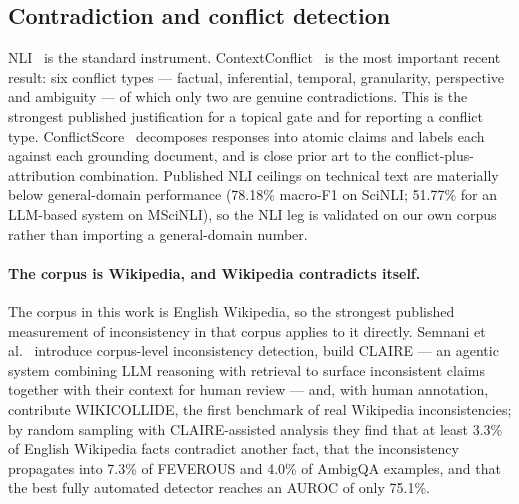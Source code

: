 \documentclass[preprint,3p,times]{elsarticle}
\begin{document}
\subsection{Contradiction and conflict detection}

NLI~\cite{williams2018mnli,nie2020anli} is the standard instrument.
ContextConflict~\cite{yang2026contextconflict} is the most important recent
result: six conflict types --- factual, inferential, temporal, granularity,
perspective and ambiguity --- of which only two are genuine contradictions. This
is the strongest published justification for a topical gate and for reporting a
conflict type. ConflictScore~\cite{liu2026conflictscore} decomposes responses
into atomic claims and labels each against each grounding document, and is
close prior art to the conflict-plus-attribution combination. Published NLI
ceilings on technical text are materially below general-domain performance
(78.18\% macro-F1 on SciNLI; 51.77\% for an LLM-based system on MSciNLI), so
the NLI leg is validated on our own corpus rather than importing a
general-domain number.

\paragraph{The corpus is Wikipedia, and Wikipedia contradicts itself.}
The corpus in this work is English Wikipedia, so the strongest published
measurement of inconsistency in that corpus applies to it directly. Semnani
et al.~\cite{semnani2025wikicollide} introduce corpus-level inconsistency
detection, build CLAIRE --- an agentic system combining LLM reasoning with
retrieval to surface inconsistent claims together with their context for human
review --- and, with human annotation, contribute WIKICOLLIDE, the first
benchmark of real Wikipedia inconsistencies; by random sampling with
CLAIRE-assisted analysis they find that at least 3.3\% of English Wikipedia
facts contradict another fact, that the inconsistency propagates into 7.3\% of
FEVEROUS and 4.0\% of AmbigQA examples, and that the best fully automated
detector reaches an AUROC of only 75.1\%.
\end{document}
